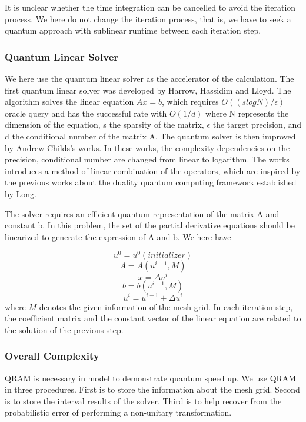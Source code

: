 \documentclass[%
 reprint,
 amsmath,amssymb,
pra,
]{revtex4-1}
\begin{document}
It is unclear whether the time integration can be cancelled to avoid the iteration process. We here do not change the iteration process, that is, we have to seek a quantum approach with sublinear runtime between each iteration step.

\subsubsection{Quantum Linear Solver}

We here use the quantum linear solver as the accelerator of the calculation. The first quantum linear solver was developed by Harrow, Hassidim and Lloyd. The algorithm solves the linear equation $Ax = b$, which requires $O((s log⁡N)/\epsilon)$ oracle query and has the successful rate with $O(1/d)$ where N represents the dimension of the equation, s the sparsity of the matrix, $\epsilon$ the target precision, and d the conditional number of the matrix A. The quantum solver is then improved by Andrew Childs’s works. In these works, the complexity dependencies on the precision, conditional number are changed from linear to logarithm. The works introduces a method of linear combination of the operators, which are inspired by the previous works about the duality quantum computing framework established by Long.

The solver requires an efficient quantum representation of the matrix A and constant b. In this problem, the set of the partial derivative equations should be linearized to generate the expression of A and b. We here have

$$
u^0=u^0(initializer)
$$
$$
A=A(u^{i-1},M)
$$
$$
x=\Delta u^i
$$
$$
b=b(u^{i-1},M)
$$
$$
u^i=u^{i-1}+\Delta u^i
$$
where $M$ denotes the given information of the mesh grid. In each iteration step, the coefficient matrix and the constant vector of the linear equation are related to the solution of the previous step.

\subsubsection{Overall Complexity}

QRAM is necessary in model to demonstrate quantum speed up. We use QRAM in three procedures. First is to store the information about the mesh grid. Second is to store the interval results of the solver. Third is to help recover from the probabilistic error of performing a non-unitary transformation.

\end{document}
